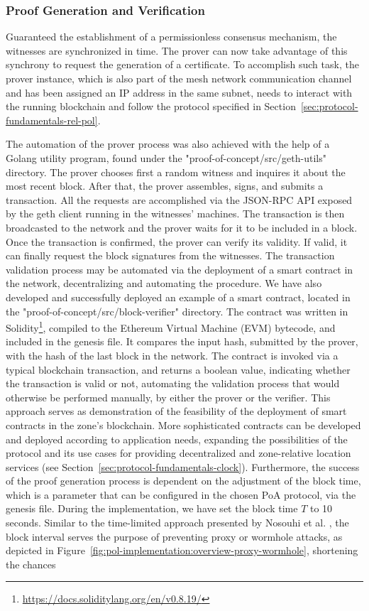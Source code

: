 \subsubsection{Proof Generation and Verification} \label{sec:pol-implementation:proof-generation-verification}

Guaranteed the establishment of a permissionless consensus mechanism, the witnesses are synchronized in time. The prover can now take advantage of this synchrony to request the generation of a \pol{} certificate. To accomplish such task, the prover instance, which is also part of the mesh network communication channel and has been assigned an IP address in the same subnet, needs to interact with the running blockchain and follow the protocol specified in Section~\ref{sec:protocol-fundamentals-rel-pol}. 

The automation of the prover process was also achieved with the help of a Golang utility program, found under the "proof-of-concept/src/geth-utils" directory. The prover chooses first a random witness and inquires it about the most recent block. After that, the prover assembles, signs, and submits a transaction. All the requests are accomplished via the JSON-RPC API exposed by the geth client running in the witnesses' machines. The transaction is then broadcasted to the network and the prover waits for it to be included in a block. Once the transaction is confirmed, the prover can verify its validity. If valid, it can finally request the block signatures from the witnesses. The transaction validation process may be automated via the deployment of a smart contract in the network, decentralizing and automating the procedure. We have also developed and successfully deployed an example of a smart contract, located in the "proof-of-concept/src/block-verifier" directory. The contract was written in Solidity\footnote{\url{https://docs.soliditylang.org/en/v0.8.19/}}, compiled to the Ethereum Virtual Machine (EVM) bytecode, and included in the genesis file. It compares the input hash, submitted by the prover, with the hash of the last block in the network. The contract is invoked via a typical blockchain transaction, and returns a boolean value, indicating whether the transaction is valid or not, automating the validation process that would otherwise be performed manually, by either the prover or the verifier. This approach serves as demonstration of the feasibility of the deployment of smart contracts in the zone's blockchain. More sophisticated contracts can be developed and deployed according to application needs, expanding the possibilities of the protocol and its use cases for providing decentralized and zone-relative location services (see Section~\ref{sec:protocol-fundamentals-clock}). Furthermore, the success of the proof generation process is dependent on the adjustment of the block time, which is a parameter that can be configured in the chosen PoA protocol, via the genesis file. During the implementation, we have set the block time $T$ to 10 seconds. Similar to the time-limited approach presented by Nosouhi et al. \cite{nosouhi2020blockchain}, the block interval serves the purpose of preventing proxy or wormhole attacks, as depicted in Figure~\ref{fig:pol-implementation:overview-proxy-wormhole}, shortening the chances 
